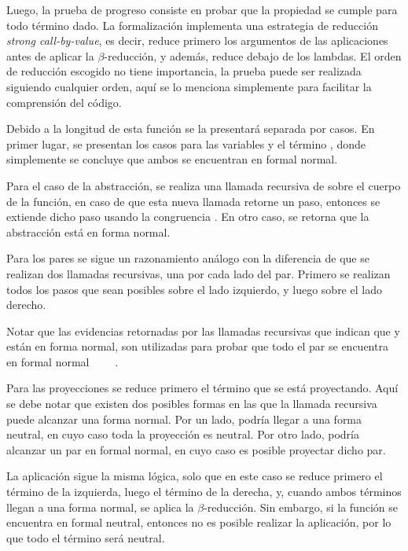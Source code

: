 Luego, la prueba de progreso consiste en probar que la propiedad  se cumple para todo término dado.
La formalización implementa una estrategia de reducción \textit{strong call-by-value}, es decir, reduce primero los argumentos de las aplicaciones antes de aplicar la $\beta$-reducción, y además, reduce debajo de los lambdas.
El orden de reducción escogido no tiene importancia, la prueba puede ser realizada siguiendo cualquier orden, aquí se lo menciona simplemente para facilitar la comprensión del código.

Debido a la longitud de esta función se la presentará separada por casos.
En primer lugar, se presentan los casos para las variables y el término \const{$\star$}, donde simplemente se concluye que ambos se encuentran en formal normal.


Para el caso de la abstracción, se realiza una llamada recursiva de  sobre el cuerpo de la función, en caso de que esta nueva llamada retorne un paso, entonces se extiende dicho paso usando la congruencia \const{$\zeta$}.
En otro caso, se retorna que la abstracción está en forma normal.


Para los pares se sigue un razonamiento análogo con la diferencia de que se realizan dos llamadas recursivas, una por cada lado del par.
Primero se realizan todos los pasos que sean posibles sobre el lado izquierdo, y luego sobre el lado derecho.


Notar que las evidencias retornadas por las llamadas recursivas que indican que  y  están en forma normal, son utilizadas para probar que todo el par se encuentra en formal normal ~~\const{,}~~\const{$\rangle$}.

Para las proyecciones se reduce primero el término que se está proyectando.
Aquí se debe notar que existen dos posibles formas en las que la llamada recursiva puede alcanzar una forma normal.
Por un lado, podría llegar a una forma neutral, en cuyo caso toda la proyección es neutral.
Por otro lado, podría alcanzar un par en formal normal, en cuyo caso es posible proyectar dicho par.


La aplicación sigue la misma lógica, solo que en este caso se reduce primero el término de la izquierda, luego el término de la derecha, y, cuando ambos términos llegan a una forma normal, se aplica la $\beta$-reducción.
Sin embargo, si la función se encuentra en formal neutral, entonces no es posible realizar la aplicación, por lo que todo el término será neutral.

